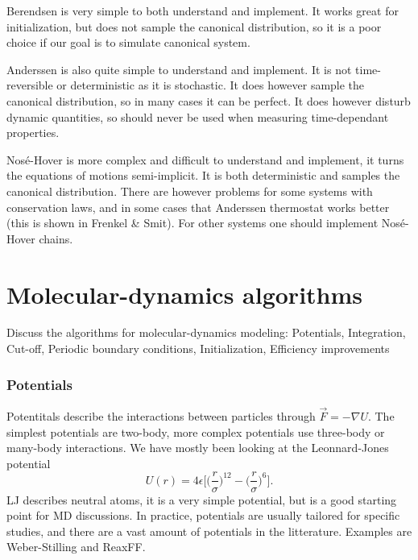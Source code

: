\documentclass[a4paper, 11pt, notitlepage, english]{article}
\renewcommand{\b}{\bigg}
\newcommand{\eps}{\epsilon}
\begin{document}
Berendsen is very simple to both understand and implement. It works great for initialization, but does not sample the canonical distribution, so it is a poor choice if our goal is to simulate canonical system.

Anderssen is also quite simple to understand and implement. It is not time-reversible or deterministic as it is stochastic. It does however sample the canonical distribution, so in many cases it can be perfect. It does however disturb dynamic quantities, so should never be used when measuring time-dependant properties.

Nosé-Hover is more complex and difficult to understand and implement, it turns the equations of motions semi-implicit. It is both deterministic and samples the canonical distribution. There are however problems for some systems with conservation laws, and in some cases that Anderssen thermostat works better (this is shown in Frenkel \& Smit). For other systems one should implement Nosé-Hover chains.



\clearpage




\section{Molecular-dynamics algorithms}
Discuss the algorithms for molecular-dynamics modeling: Potentials, Integration, Cut-off, Periodic boundary conditions, Initialization, Efficiency improvements
	
\subsubsection*{Potentials}

Potentitals describe the interactions between particles through $\vec{F} = -\nabla U$. The simplest potentials are two-body, more complex potentials use three-body or many-body interactions. We have mostly been looking at the Leonnard-Jones potential 
$$U(r) = 4\eps \bigg[\b(\frac{r}{\sigma}\b)^{12} - \b(\frac{r}{\sigma}\b)^6\bigg].$$
LJ describes neutral atoms, it is a very simple potential, but is a good starting point for MD discussions. In practice, potentials are usually tailored for specific studies, and there are a vast amount of potentials in the litterature. Examples are Weber-Stilling and ReaxFF.
\end{document}
